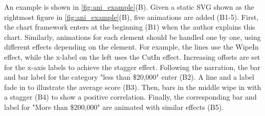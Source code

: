 
An example is shown in \autoref{fig:ani_example}(B). 
Given a static SVG shown as the rightmost figure in \autoref{fig:ani_example}(B), five animations are added (B1-5).
First, the chart framework enters at the beginning (B1) when the author explains this chart.
Similarly, animations for each element should be handled one by one, using different effects depending on the element. 
For example, the lines use the WipeIn effect, while the x-label on the left uses the CutIn effect. Increasing offsets are set for the x-axis labels to achieve the stagger effect.
Following the narration, the bar and bar label for the category "less than \$20,000" enter (B2).
A line and a label fade in to illustrate the average score (B3).
Then, bars in the middle wipe in with a stagger (B4) to show a positive correlation.
Finally, the corresponding bar and label for "More than \$200,000" are animated with similar effects (B5).



